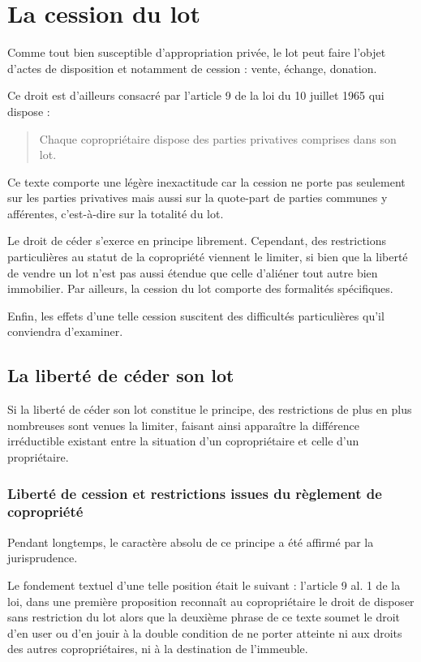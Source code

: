 \chapter{La cession du lot}

Comme tout bien susceptible d'appropriation privée, le lot peut faire l'objet d'actes de disposition et
notamment de cession : vente, échange, donation.

Ce droit est d'ailleurs consacré par l'article 9 de la loi du 10 juillet 1965 qui dispose :
\begin{quote}
	Chaque copropriétaire dispose des parties privatives comprises dans son lot.
\end{quote}

Ce texte comporte une légère inexactitude car la cession ne porte pas seulement sur les parties privatives
mais aussi sur la quote-part de parties communes y afférentes, c'est-à-dire sur la totalité du lot.

Le droit de céder s'exerce en principe librement. Cependant, des restrictions particulières au statut de la
copropriété viennent le limiter, si bien que la liberté de vendre un lot n'est pas aussi étendue que celle
d'aliéner tout autre bien immobilier. Par ailleurs, la cession du lot comporte des formalités spécifiques.

Enfin, les effets d'une telle cession suscitent des difficultés particulières qu'il conviendra d'examiner.

\section{La liberté de céder son lot}

	Si la liberté de céder son lot constitue le principe, des restrictions de plus en plus nombreuses sont venues
	la limiter, faisant ainsi apparaître la différence irréductible existant entre la situation d'un copropriétaire
	et celle d'un propriétaire.
	
	\subsection{Liberté de cession et restrictions issues du règlement de copropriété}
	
		Pendant longtemps, le caractère absolu de ce principe a été affirmé par la jurisprudence.
		
		Le fondement textuel d'une telle position était le suivant : l'article 9 al. 1\ier{} de la loi, dans une première
		proposition reconnaît au copropriétaire le droit de disposer sans restriction du lot alors que la deuxième
		phrase de ce texte soumet le droit d'en user ou d'en jouir à la double condition de ne porter atteinte ni
		aux droits des autres copropriétaires, ni à la destination de l'immeuble.
		
